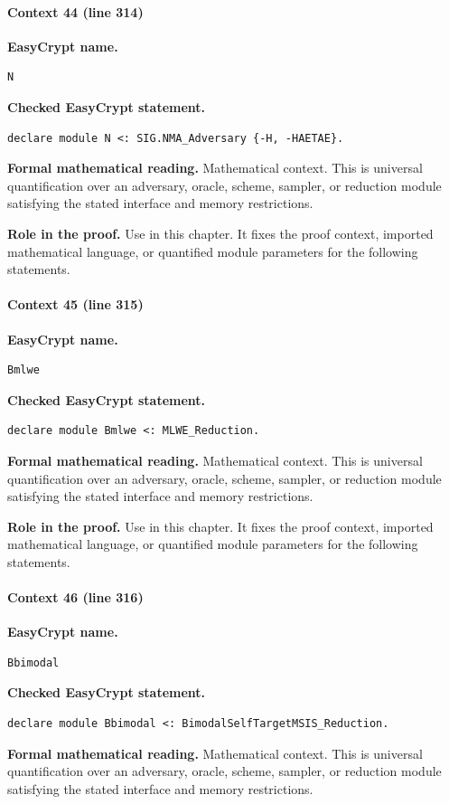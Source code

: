 \paragraph{Context 44 (line 314)}
\noindent\textbf{EasyCrypt name.}
\begin{lstlisting}[language=EasyCrypt,basicstyle=\ttfamily\scriptsize]
N
\end{lstlisting}
\noindent\textbf{Checked EasyCrypt statement.}
\begin{lstlisting}[language=EasyCrypt,basicstyle=\ttfamily\scriptsize]
declare module N <: SIG.NMA_Adversary {-H, -HAETAE}.
\end{lstlisting}
\noindent\textbf{Formal mathematical reading.}
Mathematical context. This is universal quantification over an adversary, oracle, scheme, sampler, or reduction module satisfying the stated interface and memory restrictions.

\noindent\textbf{Role in the proof.}
Use in this chapter. It fixes the proof context, imported mathematical language, or quantified module parameters for the following statements.

\paragraph{Context 45 (line 315)}
\noindent\textbf{EasyCrypt name.}
\begin{lstlisting}[language=EasyCrypt,basicstyle=\ttfamily\scriptsize]
Bmlwe
\end{lstlisting}
\noindent\textbf{Checked EasyCrypt statement.}
\begin{lstlisting}[language=EasyCrypt,basicstyle=\ttfamily\scriptsize]
declare module Bmlwe <: MLWE_Reduction.
\end{lstlisting}
\noindent\textbf{Formal mathematical reading.}
Mathematical context. This is universal quantification over an adversary, oracle, scheme, sampler, or reduction module satisfying the stated interface and memory restrictions.

\noindent\textbf{Role in the proof.}
Use in this chapter. It fixes the proof context, imported mathematical language, or quantified module parameters for the following statements.

\paragraph{Context 46 (line 316)}
\noindent\textbf{EasyCrypt name.}
\begin{lstlisting}[language=EasyCrypt,basicstyle=\ttfamily\scriptsize]
Bbimodal
\end{lstlisting}
\noindent\textbf{Checked EasyCrypt statement.}
\begin{lstlisting}[language=EasyCrypt,basicstyle=\ttfamily\scriptsize]
declare module Bbimodal <: BimodalSelfTargetMSIS_Reduction.
\end{lstlisting}
\noindent\textbf{Formal mathematical reading.}
Mathematical context. This is universal quantification over an adversary, oracle, scheme, sampler, or reduction module satisfying the stated interface and memory restrictions.


